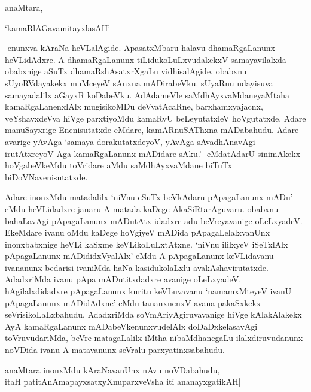 anaMtara,

\begin{shloka}
`kamaRlAGavamitayxlasAH'
\end{shloka}

-enunxva kAraNa heVLalAgide. ApasatxMbaru halavu dhamaRgaLanunx heVLidAdxre. A dhamaRgaLanunx tiLidukoLuLxvudakekxV samayavilalxda obabxnige aSuTx dhamaRshAsatxrXgaLu vidhisalAgide. obabxnu sUyoRVdayakekx muMceyeV sAnxna mADirabeVku. sUyaRnu udayisuva samayadalilx aGayxR koDabeVku. AdAdameVle saMdhAyxvaMdaneyaMtaha kamaRgaLanenxlAlx mugisikoMDu deVvatAcaRne, barxhamxyajacnx, veYshavxdeVva hiVge parxtiyoMdu kamaRvU beLeyutatxleV hoVgutatxde. Adare manuSayxrige Enenisutatxde eMdare, kamARnuSAThxna mADabahudu. Adare avarige yAvAga `samaya dorakutatxdeyoV, yAvAga sAvadhAnavAgi irutAtxreyoV Aga kamaRgaLanunx mADidare sAku.' -eMdatAdarU sinimAkekx hoVgabeVkeMdu toVridare aMdu saMdhAyxvaMdane biTuTx biDoVNavenisutatxde.

Adare inonxMdu matadalilx `niVnu eSuTx beVkAdaru pApagaLanunx mADu' eMdu heVLidadxre janaru A matada kaDege AkaSiRtarAguvaru. obabxnu bahaLavAgi pApagaLanunx mADutAtx idadxre adu beVreyavanige oLeLxyadeV. EkeMdare ivanu oMdu kaDege hoVgiyeV mADida pApagaLelalxvanUnx inonxbabxnige heVLi kaSxme keVLikoLuLxtAtxne. `niVnu ililxyeV iSeTxlAlx pApagaLanunx mADididxVyalAlx' eMdu A pApagaLanunx keVLidavanu ivananunx bedarisi ivaniMda haNa kasidukolaLxlu avakAshavirutatxde. AdadxriMda ivanu pApa mADutitxdadxre avanige oLeLxyadeV. hAgilalxdidadxre pApagaLanunx kuritu keVLuvavanu `namamxMteyeV ivanU pApagaLanunx mADidAdxne' eMdu tananxnenxV avana pakaSxkekx seVrisikoLaLxbahudu. AdadxriMda soVmAriyAgiruvavanige hiVge kAlakAlakekx AyA kamaRgaLanunx mADabeVkenunxvudelAlx doDaDxkelasavAgi toVruvudariMda, beVre matagaLalilx iMtha nibaMdhanegaLu ilalxdiruvudanunx noVDida ivanu A matavanunx seVralu parxyatinxsabahudu.

\begin{center}
anaMtara inonxMdu kAraNavanUnx nAvu noVDabahudu,\\
itaH patitAnAmapayxsatxyXnuparxveVsha iti ananayxgatikAH|
\end{center} 


